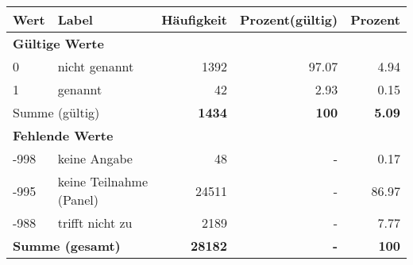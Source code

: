      \begin{longtable}{lXrrr}
     \toprule
     \textbf{Wert} & \textbf{Label} & \textbf{Häufigkeit} & \textbf{Prozent(gültig)} & \textbf{Prozent} \\
     \endhead
     \midrule
     \multicolumn{5}{l}{\textbf{Gültige Werte}}\\

     0 &
     \multicolumn{1}{X}{ nicht genannt   } &


       \num{1392} &
       \num[round-mode=places,round-precision=2]{97.07} &
         \num[round-mode=places,round-precision=2]{4.94} \\

     1 &
     \multicolumn{1}{X}{ genannt   } &


       \num{42} &
       \num[round-mode=places,round-precision=2]{2.93} &
         \num[round-mode=places,round-precision=2]{0.15} \\
     \midrule
     \multicolumn{2}{l}{Summe (gültig)} &
       \textbf{\num{1434}} &
     \textbf{\num{100}} &
       \textbf{\num[round-mode=places,round-precision=2]{5.09}} \\
     \multicolumn{5}{l}{\textbf{Fehlende Werte}}\\
       -998 &
       keine Angabe &
         \num{48} &
        - &
         \num[round-mode=places,round-precision=2]{0.17} \\
       -995 &
       keine Teilnahme (Panel) &
         \num{24511} &
        - &
         \num[round-mode=places,round-precision=2]{86.97} \\
       -988 &
       trifft nicht zu &
         \num{2189} &
        - &
         \num[round-mode=places,round-precision=2]{7.77} \\
     \midrule
     \multicolumn{2}{l}{\textbf{Summe (gesamt)}} &
          \textbf{\num{28182}} &
        \textbf{-} &
        \textbf{\num{100}} \\
     \bottomrule
     \end{longtable}
     
